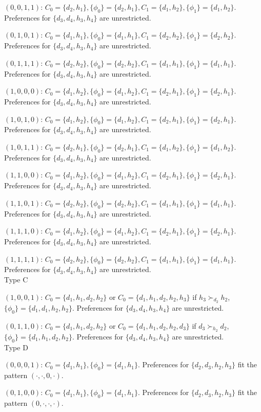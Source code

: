 \documentclass[WP]{AEA}
\begin{document}
$(0,0,1,1)$: $C_0 =\{d_2,h_1\}, \{\phi_0\}=\{d_2,h_1\}, C_1 =\{d_1,h_2\}, \{\phi_1\}=\{d_1,h_2\}$.  Preferences for $\{d_3,d_4,h_3,h_4\}$ are unrestricted.


$(0,1,0,1)$: $C_0 =\{d_1,h_1\}, \{\phi_0\}=\{d_1,h_1\}, C_1 =\{d_2,h_2\}, \{\phi_1\}=\{d_2,h_2\}$.  Preferences for $\{d_3,d_4,h_3,h_4\}$ are unrestricted.


$(0,1,1,1)$: $C_0 =\{d_2,h_2\}, \{\phi_0\}=\{d_2,h_2\}, C_1 =\{d_1,h_1\}, \{\phi_1\}=\{d_1,h_1\}$.  Preferences for $\{d_3,d_4,h_3,h_4\}$ are unrestricted.


$(1,0,0,0)$: $C_0 =\{d_1,h_2\}, \{\phi_0\}=\{d_1,h_2\}, C_1 =\{d_2,h_1\}, \{\phi_1\}=\{d_2,h_1\}$.  Preferences for $\{d_3,d_4,h_3,h_4\}$ are unrestricted.


$(1,0,1,0)$: $C_0 =\{d_1,h_2\}, \{\phi_0\}=\{d_1,h_2\}, C_1 =\{d_2,h_1\}, \{\phi_1\}=\{d_2,h_1\}$.  Preferences for $\{d_3,d_4,h_3,h_4\}$ are unrestricted.


$(1,0,1,1)$: $C_0 =\{d_2,h_1\}, \{\phi_0\}=\{d_2,h_1\}, C_1 =\{d_1,h_2\}, \{\phi_1\}=\{d_1,h_2\}$.  Preferences for $\{d_3,d_4,h_3,h_4\}$ are unrestricted.



$(1,1,0,0)$:  $C_0 =\{d_1,h_2\}, \{\phi_0\}=\{d_1,h_2\}, C_1 =\{d_2,h_1\}, \{\phi_1\}=\{d_2,h_1\}$.  Preferences for $\{d_3,d_4,h_3,h_4\}$ are unrestricted.


$(1,1,0,1)$:  $C_0 =\{d_2,h_2\}, \{\phi_0\}=\{d_2,h_2\}, C_1 =\{d_1,h_1\}, \{\phi_1\}=\{d_1,h_1\}$.  Preferences for $\{d_3,d_4,h_3,h_4\}$ are unrestricted.



$(1,1,1,0)$:  $C_0 =\{d_1,h_2\}, \{\phi_0\}=\{d_1,h_2\}, C_1 =\{d_2,h_1\}, \{\phi_1\}=\{d_2,h_1\}$.  Preferences for $\{d_3,d_4,h_3,h_4\}$ are unrestricted.



$(1,1,1,1)$:  $C_0 =\{d_2,h_2\}, \{\phi_0\}=\{d_2,h_2\}, C_1 =\{d_1,h_1\}, \{\phi_1\}=\{d_1,h_1\}$.  Preferences for $\{d_3,d_4,h_3,h_4\}$ are unrestricted.
\\

Type C

$(1,0,0,1)$:  $C_0 =\{d_1,h_1,d_2,h_2\}$ or $C_0 =\{d_1,h_1,d_2,h_2, h_3\}$ if $h_3\succ_{d_2} h_2$, $\{\phi_0\}=\{d_1,d_1,h_2,h_2\}$.  Preferences for $\{d_3,d_4,h_3,h_4\}$ are unrestricted. 

$(0,1,1,0)$:  $C_0 =\{d_1,h_1,d_2,h_2\}$ or $C_0 =\{d_1,h_1,d_2,h_2, d_3\}$ if $d_3\succ_{h_2} d_2$, $\{\phi_0\}=\{d_1,h_1,d_2,h_2\}$.  Preferences for $\{d_3,d_4,h_3,h_4\}$ are unrestricted. 
\\


Type D

$(0,0,0,1)$:  $C_0 =\{d_1,h_1\}, \{\phi_0\}=\{d_1,h_1\}$.  Preferences for $\{d_2,d_3,h_2,h_3\}$ fit the pattern $(\cdot,\cdot,0,\cdot)$.


$(0,1,0,0)$:  $C_0 =\{d_1,h_1\}, \{\phi_0\}=\{d_1,h_1\}$.  Preferences for $\{d_2,d_3,h_2,h_3\}$ fit the pattern $(0,\cdot,\cdot,\cdot)$.
\end{document}
